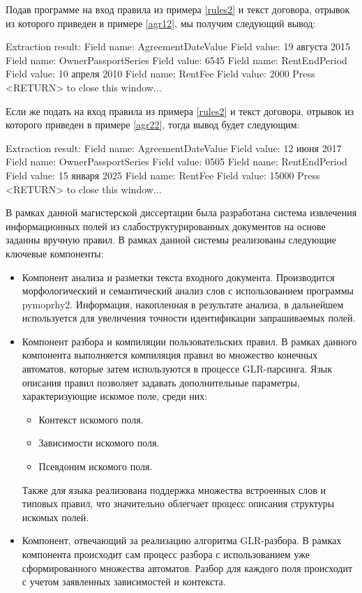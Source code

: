 Подав программе на вход правила из примера \ref{rules2} и текст договора, отрывок из которого приведен в примере \ref{agr12}, мы получим следующий вывод:
\begin{Verb}
Extraction result:
Field name: AgreementDateValue
Field value: 19 августа 2015 
Field name: OwnerPassportSeries
Field value: 6545 
Field name: RentEndPeriod
Field value: 10 апреля 2010 
Field name: RentFee
Field value: 2000 
Press <RETURN> to close this window...
\end{Verb}

Если же подать на вход правила из примера \ref{rules2} и текст договора, отрывок из которого приведен в примере \ref{agr22}, тогда вывод будет следующим:
\begin{Verb}
Extraction result:
Field name: AgreementDateValue
Field value: 12 июня 2017 
Field name: OwnerPassportSeries
Field value: 0505 
Field name: RentEndPeriod
Field value: 15 января 2025 
Field name: RentFee
Field value: 15000 
Press <RETURN> to close this window...
\end{Verb}

\Conc

В рамках данной магистерской диссертации была разработана система извлечения информационных полей из слабоструктурированных документов на основе заданны вручную правил. В рамках данной системы реализованы следующие ключевые компоненты:
\begin{itemize}
  \item Компонент анализа и разметки текста входного документа. Производится морфологический и семантический анализ слов с использованием программы pymoprhy2. Информация, накопленная в результате анализа, в дальнейшем используется для увеличения точности идентификации запрашиваемых полей.
  \item Компонент разбора и компиляции пользовательских правил. В рамках данного компонента выполняется компиляция правил во множество конечных автоматов, которые затем используются в процессе GLR-парсинга. Язык описания правил позволяет задавать дополнительные параметры, характеризующие искомое поле, среди них:
  \begin{itemize}
    \item Контекст искомого поля.
    \item Зависимости искомого поля.
    \item Псевдоним искомого поля.
  \end{itemize}
  Также для языка реализована поддержка множества встроенных слов и типовых правил, что значительно облегчает процесс описания структуры искомых полей.
  \item Компонент, отвечающий за реализацию алгоритма GLR-разбора. В рамках компонента происходит сам процесс разбора с использованием уже сформированного множества автоматов. Разбор для каждого поля происходит с учетом заявленных зависимостей и контекста.
\end{itemize}

